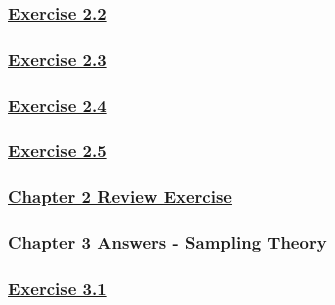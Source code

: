 \documentclass[
  11pt,
]{book}
\begin{document}
\subsubsection*{\texorpdfstring{\hyperref[ex22q]{Exercise 2.2}}{Exercise 2.2}}\label{exercise-2.2-1}

\subsubsection*{\texorpdfstring{\hyperref[ex23q]{Exercise 2.3}}{Exercise 2.3}}\label{exercise-2.3-1}

\subsubsection*{\texorpdfstring{\hyperref[ex24q]{Exercise 2.4}}{Exercise 2.4}}\label{exercise-2.4-1}

\subsubsection*{\texorpdfstring{\hyperref[ex25q]{Exercise 2.5}}{Exercise 2.5}}\label{exercise-2.5-1}

\subsubsection*{\texorpdfstring{\hyperref[re2q]{Chapter 2 Review Exercise}}{Chapter 2 Review Exercise}}\label{chapter-2-review-exercise}

\subsubsection*{Chapter 3 Answers - Sampling Theory}\label{chapter-3-answers---sampling-theory}

\subsubsection*{\texorpdfstring{\hyperref[ex31q]{Exercise 3.1}}{Exercise 3.1}}\label{exercise-3.1-1}
\end{document}
